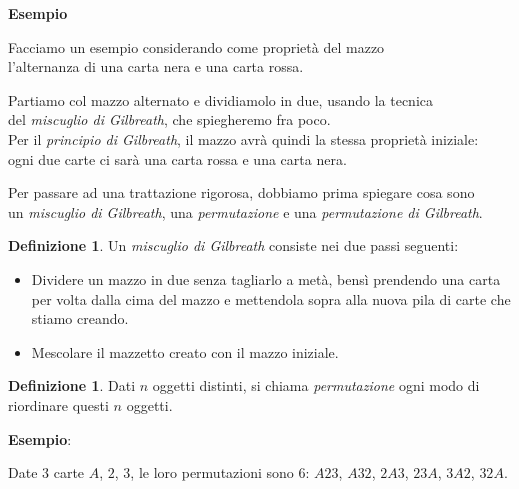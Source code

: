 \documentclass[8pt]{beamer}
\theoremstyle{plain}
\theoremstyle{definition}
\newtheorem{defin}[thm]{Definizione}
\begin{document}
\begin{frame}\begin{center}
\textbf{Esempio}

\bigskip
\medskip

Facciamo un esempio considerando come proprietà del mazzo \\l'alternanza di una carta nera e una carta rossa.

\medskip
\medskip

Partiamo col mazzo alternato e dividiamolo in due, usando la tecnica \\ del \textit{miscuglio di Gilbreath}, che spiegheremo fra poco. \\Per il \textit{principio di Gilbreath}, il mazzo avrà quindi la stessa proprietà iniziale: \\ ogni due carte ci sarà una carta rossa e una carta nera.
\end{center}
\end{frame}

\begin{frame}\begin{center}
Per passare ad una trattazione rigorosa, dobbiamo prima spiegare cosa sono \\ un \textit{miscuglio di Gilbreath}, una \textit{permutazione} e una \textit{permutazione di Gilbreath}.

\medskip
\medskip

\begin{defin} Un \textit{miscuglio di Gilbreath} consiste nei due passi seguenti:
\begin{itemize}
\item[1)] Dividere un mazzo in due senza tagliarlo a metà, bensì prendendo una carta per volta dalla cima del mazzo e mettendola sopra alla nuova pila di carte che stiamo creando.
\item[2)] Mescolare il mazzetto creato con il mazzo iniziale.
\end{itemize}
\end{defin}
\end{center}
\end{frame}

\begin{frame}\begin{center}\begin{defin}Dati $n$ oggetti distinti, si chiama \textit{permutazione} ogni modo di riordinare questi $n$ oggetti. \end{defin}

\bigskip
\bigskip

\textbf{Esempio}:

\medskip

Date 3 carte $A$, $2$, $3$, le loro permutazioni sono 6: $A23$, $A32$, $2A3$, $23A$, $3A2$, $32A$. 
\end{center}
\end{frame}
\end{document}
